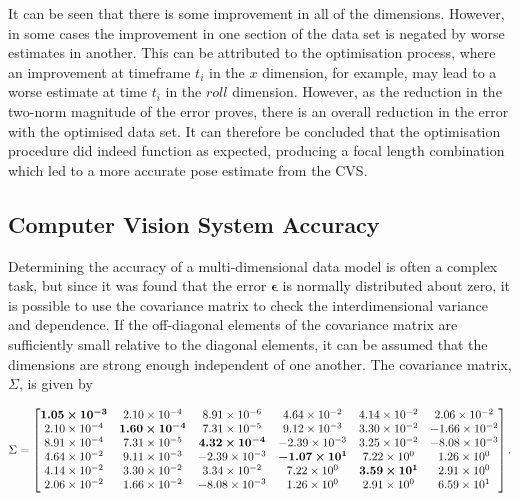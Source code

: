It can be seen that there is some improvement in all of the dimensions. However, in some cases the improvement in one section of the data set is negated by worse estimates in another. This can be attributed to the optimisation process, where an improvement at timeframe $t_i$ in the $x$ dimension, for example, may lead to a worse estimate at time $t_i$ in the $roll$ dimension. However, as the reduction in the two-norm magnitude of the error proves, there is an overall reduction in the error with the optimised data set. It can therefore be concluded that the optimisation procedure did indeed function as expected, producing a focal length combination which led to a more accurate pose estimate from the CVS. 

\subsection{Computer Vision System Accuracy}

Determining the accuracy of a multi-dimensional data model is often a complex task, but since it was found that the error $\bm{\epsilon}$ is normally distributed about zero, it is possible to use the covariance matrix to check the interdimensional variance and dependence. If the off-diagonal elements of the covariance matrix are sufficiently small relative to the diagonal elements, it can be assumed that the dimensions are strong enough independent of one another. The covariance matrix, $\Sigma$, is given by  

\setlength{\arraycolsep}{2pt}
\footnotesize
\begin{equation}
  \label{eq:covariance-matrix}
  \Sigma = 
  \begin{bmatrix}
    \bm{1.05\times 10^{-3}}  &  2.10\times 10^{-4}       &  8.91\times 10^{-6}       &  4.64\times 10^{-2}       &  4.14\times 10^{-2}      &  2.06\times 10^{-2}  \\
    2.10\times 10^{-4}       &  \bm{1.60\times 10^{-4}}  &  7.31\times 10^{-5}       &  9.12\times 10^{-3}       &  3.30\times 10^{-2}      & -1.66\times 10^{-2}  \\
    8.91\times 10^{-4}       &  7.31\times 10^{-5}       &  \bm{4.32\times 10^{-4}}  & -2.39\times 10^{-3}       &  3.25\times 10^{-2}      & -8.08\times 10^{-3}  \\
    4.64\times 10^{-2}       &  9.11\times 10^{-3}       & -2.39\times 10^{-3}       &  \bm{-1.07\times 10^{1}}  &  7.22\times 10^{0}       &  1.26\times 10^{0}   \\
    4.14\times 10^{-2}       &  3.30\times 10^{-2}       &  3.34\times 10^{-2}       &  7.22\times 10^{0}        &  \bm{3.59\times 10^{1}}  &  2.91\times 10^{0}   \\
    2.06\times 10^{-2}       &  1.66\times 10^{-2}       & -8.08\times 10^{-3}       &  1.26\times 10^{0}        &  2.91\times 10^{0}       &  6.59\times 10^{1}   \\
  \end{bmatrix}.
  \end{equation}
\normalsize

